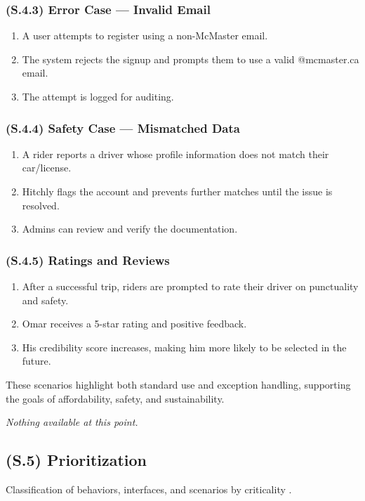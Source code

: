 \documentclass[12pt,letterpaper]{article}
\begin{document}
\subsubsection{(S.4.3) Error Case — Invalid Email} %
\begin{enumerate}
    \item A user attempts to register using a non-McMaster email.
    \item The system rejects the signup and prompts them to use a valid @mcmaster.ca email.
    \item The attempt is logged for auditing.
\end{enumerate}

\subsubsection{(S.4.4) Safety Case — Mismatched Data} %
\begin{enumerate}
    \item A rider reports a driver whose profile information does not match their car/license.
    \item Hitchly flags the account and prevents further matches until the issue is resolved.
    \item Admins can review and verify the documentation.
\end{enumerate}

\subsubsection{(S.4.5) Ratings and Reviews} %
\begin{enumerate}
    \item After a successful trip, riders are prompted to rate their driver on punctuality and safety.
    \item Omar receives a 5-star rating and positive feedback.
    \item His credibility score increases, making him more likely to be selected in the future.
\end{enumerate}

These scenarios highlight both standard use and exception handling, supporting the goals of affordability, safety, and sustainability.

\textit{Nothing available at this point.}

\subsection{(S.5) Prioritization}
Classification of behaviors, interfaces, and scenarios by criticality \cite{meyer2022}.
\end{document}

